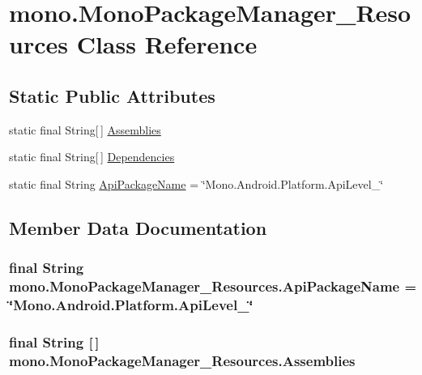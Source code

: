 \hypertarget{classmono_1_1_mono_package_manager___resources}{
\section{mono.MonoPackageManager\_\-Resources Class Reference}
\label{classmono_1_1_mono_package_manager___resources}
}
\subsection*{Static Public Attributes}
\begin{CompactItemize}
\item 
static final String\mbox{[}$\,$\mbox{]} \hyperlink{classmono_1_1_mono_package_manager___resources_849c4107d82756d7befde78bafdfb523}{Assemblies}
\item 
static final String\mbox{[}$\,$\mbox{]} \hyperlink{classmono_1_1_mono_package_manager___resources_1a4fbf906de516a47baf97dc3797c34d}{Dependencies}
\item 
static final String \hyperlink{classmono_1_1_mono_package_manager___resources_7b5f3e587db8469615a9c1f57fbdbc99}{ApiPackageName} = \char`\"{}Mono.Android.Platform.ApiLevel\_\char`\"{}
\end{CompactItemize}


\subsection{Member Data Documentation}
\hypertarget{classmono_1_1_mono_package_manager___resources_7b5f3e587db8469615a9c1f57fbdbc99}{
\subsubsection[{ApiPackageName}]{\setlength{\rightskip}{0pt plus 5cm}final String {\bf mono.MonoPackageManager\_\-Resources.ApiPackageName} = \char`\"{}Mono.Android.Platform.ApiLevel\_\char`\"{}}}
\label{classmono_1_1_mono_package_manager___resources_7b5f3e587db8469615a9c1f57fbdbc99}


\hypertarget{classmono_1_1_mono_package_manager___resources_849c4107d82756d7befde78bafdfb523}{
\subsubsection[{Assemblies}]{\setlength{\rightskip}{0pt plus 5cm}final String \mbox{[}$\,$\mbox{]} {\bf mono.MonoPackageManager\_\-Resources.Assemblies}}}
\label{classmono_1_1_mono_package_manager___resources_849c4107d82756d7befde78bafdfb523}


